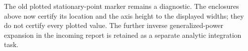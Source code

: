 The old plotted stationary-point marker remains a diagnostic. The
enclosures above now certify its location and the axis height to the
displayed widths; they do not certify every plotted value.
The further inverse generalized-power expansion in the incoming report
is retained as a separate analytic integration task.
